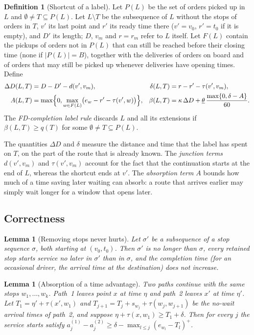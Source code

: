\documentclass[review,12pt]{elsarticle}
\newtheorem{lemma}[theorem]{Lemma}
\theoremstyle{definition}
\newtheorem{definition}[theorem]{Definition}
\theoremstyle{remark}
\newcommand{\lth}{\underline{\theta}}
\begin{document}
\begin{definition}[Shortcut of a label]
\label{def:shortcut}
Let $P(L)$ be the set of orders picked up in $L$ and
$\emptyset\ne T\subseteq P(L)$. Let $L\setminus T$ be the subsequence of $L$
without the stops of orders in $T$, $v'$ its last point and $r'$ its ready
time there ($v'=v_0$, $r'=t_0$ if it is empty), and $D'$ its length; $D$,
$v_m$ and $r=r_m$ refer to $L$ itself. Let $F(L)$ contain the pickups of
orders not in $P(L)$ that can still be reached before their closing time
(none if $|P(L)|=B$), together with the deliveries of orders on board and
of orders that may still be picked up whenever deliveries have opening
times. Define
\begin{align*}
\Delta D(L,T)&=D-D'-d(v',v_m), &
\delta(L,T)&=r-r'-\tau(v',v_m),\\
A(L,T)&=\max\Bigl\{0,\max_{w\in F(L)}\bigl(e_w-r'-\tau(v',w)\bigr)\Bigr\}, &
\beta(L,T)&=\kappa\,\Delta D+\lth\,\frac{\max\{0,\delta-A\}}{60}.
\end{align*}
The \emph{FD-completion label rule} discards $L$ and all its extensions if
$\beta(L,T)\ge q(T)$ for some $\emptyset\ne T\subseteq P(L)$.
\end{definition}

The quantities $\Delta D$ and $\delta$ measure the distance and time that
the label has spent on $T$, on the part of the route that is already
known. The \emph{junction terms} $d(v',v_m)$ and $\tau(v',v_m)$ account for
the fact that the continuation starts at the end of $L$, whereas the
shortcut ends at $v'$. The \emph{absorption term} $A$ bounds how much of a
time saving later waiting can absorb: a route that arrives earlier may
simply wait longer for a window that opens later.

\subsection{Correctness}

\begin{lemma}[Removing stops never hurts]
\label{lem:remove}
Let $\sigma'$ be a subsequence of a stop sequence $\sigma$, both starting
at $(v_0,t_0)$. Then $\sigma'$ is no longer than $\sigma$, every retained
stop starts service no later in $\sigma'$ than in $\sigma$, and the
completion time (for an occasional driver, the arrival time at the
destination) does not increase.
\end{lemma}

\begin{lemma}[Absorption of a time advantage]
\label{lem:absorb}
Two paths continue with the same stops $w_1,\dots,w_k$. Path~1 leaves
point $x$ at time $\eta$ and path~2 leaves $x'$ at time $\eta'$. Let
$T_1=\eta'+\tau(x',w_1)$ and $T_{j+1}=T_j+s_{w_j}+\tau(w_j,w_{j+1})$ be the
no-wait arrival times of path~2, and suppose $\eta+\tau(x,w_1)\ge T_1+\delta$.
Then for every $j$ the service starts satisfy
$a^{(1)}_j-a^{(2)}_j\ge\delta-\max_{l\le j}(e_{w_l}-T_l)^+$.
\end{lemma}
\end{document}
